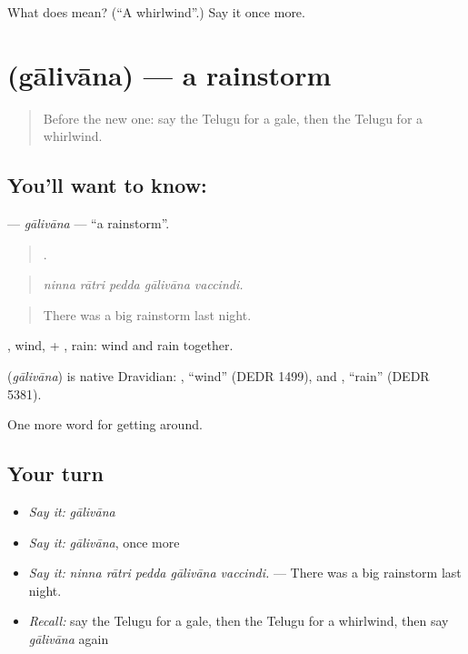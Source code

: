\begin{tcolorbox}[breakable,colback=teal!4,colframe=teal!35!black,title={Before you move on}]
What does  mean? (\textquotedblleft{}A whirlwind\textquotedblright{}.) Say it once more.
\end{tcolorbox}
\section[\texorpdfstring{\te{గాలివాన} (gālivāna)}{గాలివాన (gālivāna)}]{ (gālivāna) — a rainstorm}

\label{lesson:TE-C478-galivana}



\begin{quote}
Before the new one: say the Telugu for a gale, then the Telugu for a whirlwind.
\end{quote}

\subsection*{You'll want to know: }
\textbf{} — \emph{gālivāna} — \textquotedblleft{}a rainstorm\textquotedblright{}.

\begin{quote}
    .
\end{quote}

\begin{quote}
\emph{ninna rātri pedda gālivāna vaccindi.}
\end{quote}

\begin{quote}
There was a big rainstorm last night.
\end{quote}

, wind, + , rain: wind and rain together.

\begin{cousinweb}
\textbf{} (\emph{gālivāna}) is native Dravidian: , \textquotedblleft{}wind\textquotedblright{} (DEDR 1499), and , \textquotedblleft{}rain\textquotedblright{} (DEDR 5381).
\end{cousinweb}

\begin{grammarlens}[title={What you've built}]
One more word for getting around.
\end{grammarlens}

\subsection*{Your turn}
\begin{itemize}
\raggedright
  \item \emph{Say it:} \emph{gālivāna}
  \item \emph{Say it:} \emph{gālivāna}, once more
  \item \emph{Say it:} \emph{ninna rātri pedda gālivāna vaccindi.} — There was a big rainstorm last night.
  \item \emph{Recall:} say the Telugu for a gale, then the Telugu for a whirlwind, then say \emph{gālivāna} again
\end{itemize}

